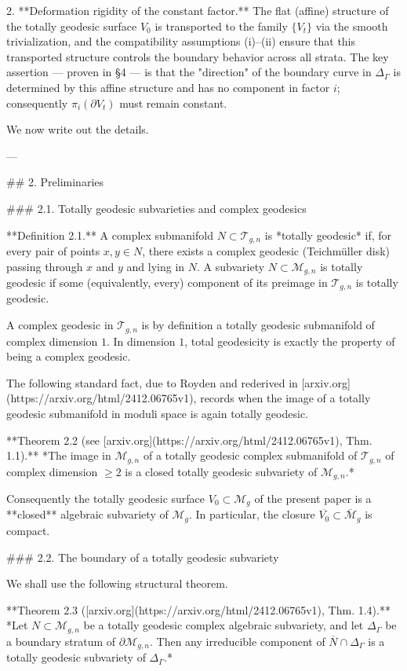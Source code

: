 2. **Deformation rigidity of the constant factor.** The flat (affine) structure of the totally geodesic surface $V_0$ is transported to the family $\{V_t\}$ via the smooth trivialization, and the compatibility assumptions (i)–(ii) ensure that this transported structure controls the boundary behavior across all strata. The key assertion — proven in §4 — is that the "direction" of the boundary curve in $\Delta_\Gamma$ is determined by this affine structure and has no component in factor $i$; consequently $\pi_i(\partial V_t)$ must remain constant.

We now write out the details.

---

## 2. Preliminaries

### 2.1. Totally geodesic subvarieties and complex geodesics

**Definition 2.1.** A complex submanifold $N \subset \mathcal{T}_{g,n}$ is *totally geodesic* if, for every pair of points $x, y \in N$, there exists a complex geodesic (Teichmüller disk) passing through $x$ and $y$ and lying in $N$. A subvariety $N \subset \mathcal{M}_{g,n}$ is totally geodesic if some (equivalently, every) component of its preimage in $\mathcal{T}_{g,n}$ is totally geodesic.

A complex geodesic in $\mathcal{T}_{g,n}$ is by definition a totally geodesic submanifold of complex dimension $1$. In dimension $1$, total geodesicity is exactly the property of being a complex geodesic.

The following standard fact, due to Royden and rederived in [arxiv.org](https://arxiv.org/html/2412.06765v1), records when the image of a totally geodesic submanifold in moduli space is again totally geodesic.

**Theorem 2.2 (see [arxiv.org](https://arxiv.org/html/2412.06765v1), Thm. 1.1).** *The image in $\mathcal{M}_{g,n}$ of a totally geodesic complex submanifold of $\mathcal{T}_{g,n}$ of complex dimension $\geq 2$ is a closed totally geodesic subvariety of $\mathcal{M}_{g,n}$.*

Consequently the totally geodesic surface $V_0 \subset \mathcal{M}_g$ of the present paper is a **closed** algebraic subvariety of $\mathcal{M}_g$. In particular, the closure $\overline{V_0} \subset \overline{\mathcal{M}}_g$ is compact.

### 2.2. The boundary of a totally geodesic subvariety

We shall use the following structural theorem.

**Theorem 2.3 ([arxiv.org](https://arxiv.org/html/2412.06765v1), Thm. 1.4).** *Let $N \subset \mathcal{M}_{g,n}$ be a totally geodesic complex algebraic subvariety, and let $\Delta_\Gamma$ be a boundary stratum of $\partial \mathcal{M}_{g,n}$. Then any irreducible component of $\overline{N} \cap \Delta_\Gamma$ is a totally geodesic subvariety of $\Delta_\Gamma$.*

